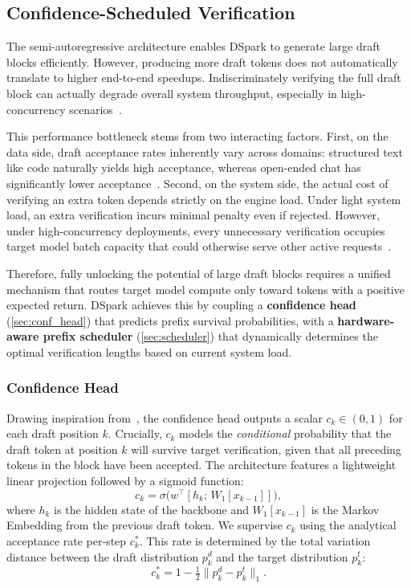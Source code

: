 \subsection{Confidence-Scheduled Verification}  
\label{sec:confidence}  

The semi-autoregressive architecture enables DSpark to generate large draft blocks efficiently. However, producing more draft tokens does not automatically translate to higher end-to-end speedups. Indiscriminately verifying the full draft block can actually degrade overall system throughput, especially in high-concurrency scenarios~\citep{liu2024turbospec,hu2026echo}.

This performance bottleneck stems from two interacting factors. 
First, on the data side, draft acceptance rates inherently vary across domains: structured text like code naturally yields high acceptance, whereas open-ended chat has significantly lower acceptance~\citep{xia-etal-2024-unlocking,abramovich2026speed}.
Second, on the system side, the actual cost of verifying an extra token depends strictly on the engine load. Under light system load, an extra verification incurs minimal penalty even if rejected. However, under high-concurrency deployments, every unnecessary verification occupies target model batch capacity that could otherwise serve other active requests~\citep{liu2024optimizing, wu-etal-2025-tetris}.

Therefore, fully unlocking the potential of large draft blocks requires a unified mechanism that routes target model compute only toward tokens with a positive expected return. DSpark achieves this by coupling a \textbf{confidence head} (\autoref{sec:conf_head}) that predicts prefix survival probabilities, with a \textbf{hardware-aware prefix scheduler} (\autoref{sec:scheduler}) that dynamically determines the optimal verification lengths based on current system load.

\subsubsection{Confidence Head}
\label{sec:conf_head}
Drawing inspiration from~\citet{huang2024specdec++,wang2025end}, the confidence head outputs a scalar   $c_k \in (0, 1)$ for each draft position $k$. Crucially, $c_k$ models the \textit{conditional} probability that the draft token at position $k$ will survive target verification, given that all preceding tokens in the block have been accepted.  
The architecture features a lightweight linear projection followed by a sigmoid function:  
\begin{equation}  
c_k = \sigma\bigl(w^\top [h_k;\, W_1[x_{k-1}]]\bigr),  
\label{eq:confidence}  
\end{equation}  
where $h_k$ is the hidden state of the backbone and $W_1[x_{k-1}]$ is the Markov Embedding from the previous draft token. We supervise $c_k$ using the analytical acceptance rate per-step $c_k^*$. This rate is determined by the total variation distance between the draft distribution $p_k^d$ and the target distribution $p_k^t$:  
\begin{equation}  
c_k^* = 1 - \tfrac{1}{2}\|p_k^d - p_k^t\|_1.  
\label{eq:accept_rate}  
\end{equation}

